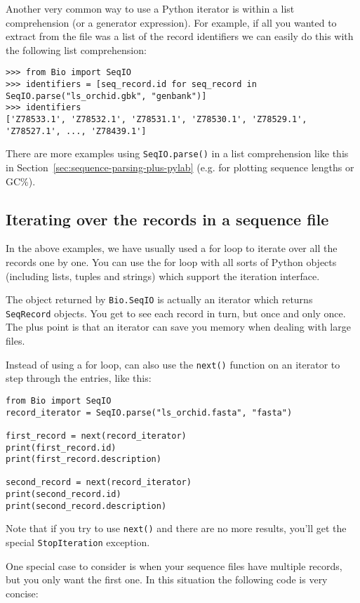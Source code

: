Another very common way to use a Python iterator is within a list comprehension (or
a generator expression).  For example, if all you wanted to extract from the file was
a list of the record identifiers we can easily do this with the following list comprehension:

\begin{verbatim}
>>> from Bio import SeqIO
>>> identifiers = [seq_record.id for seq_record in SeqIO.parse("ls_orchid.gbk", "genbank")]
>>> identifiers
['Z78533.1', 'Z78532.1', 'Z78531.1', 'Z78530.1', 'Z78529.1', 'Z78527.1', ..., 'Z78439.1']
\end{verbatim}

\noindent There are more examples using \verb|SeqIO.parse()| in a list
comprehension like this in Section~\ref{sec:sequence-parsing-plus-pylab}
(e.g. for plotting sequence lengths or GC\%).

\subsection{Iterating over the records in a sequence file}

In the above examples, we have usually used a for loop to iterate over all the records one by one.  You can use the for loop with all sorts of Python objects (including lists, tuples and strings) which support the iteration interface.

The object returned by \verb|Bio.SeqIO| is actually an iterator which returns \verb|SeqRecord| objects.  You get to see each record in turn, but once and only once.  The plus point is that an iterator can save you memory when dealing with large files.

Instead of using a for loop, can also use the \verb|next()| function on an iterator to step through the entries, like this:

\begin{verbatim}
from Bio import SeqIO
record_iterator = SeqIO.parse("ls_orchid.fasta", "fasta")

first_record = next(record_iterator)
print(first_record.id)
print(first_record.description)

second_record = next(record_iterator)
print(second_record.id)
print(second_record.description)
\end{verbatim}

Note that if you try to use \verb|next()| and there are no more results, you'll get the special \verb|StopIteration| exception.

One special case to consider is when your sequence files have multiple records, but you only want the first one.  In this situation the following code is very concise:


